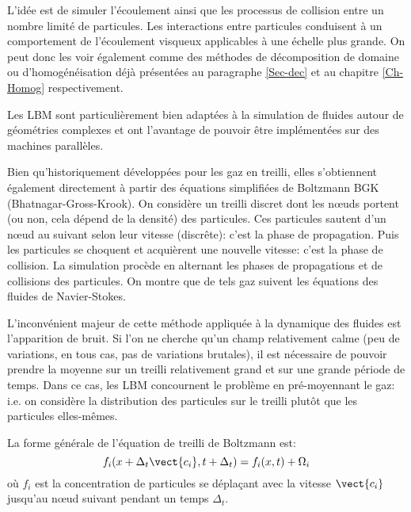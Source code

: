 L'idée est de simuler l'écoulement ainsi que les processus de collision entre un nombre limité de 
particules. Les interactions entre particules conduisent à un comportement de l'écoulement 
visqueux applicables à une échelle plus grande. 
On peut donc les voir également comme des méthodes de décomposition de domaine ou
d'homogénéisation déjà présentées au paragraphe \ref{Sec-dec} et au chapitre \ref{Ch-Homog}
respectivement.


\medskip
Les LBM sont particulièrement bien adaptées à la simulation de fluides autour de géométries
complexes et ont l'avantage de pouvoir être implémentées sur des machines parallèles.

Bien qu'historiquement développées pour les gaz en treilli, elles s'obtiennent également directement
à partir des équations simplifiées de Boltzmann BGK (Bhatnagar-Gross-Krook).
On considère un treilli discret dont les nœuds portent (ou non, cela dépend de la
densité) des particules.
Ces particules sautent d'un nœud au suivant selon leur vitesse (discrête): c'est la
phase de propagation.
Puis les particules se choquent et acquièrent une nouvelle vitesse: c'est la phase de collision.
La simulation procède en alternant les phases de propagations et de collisions des particules. 
On montre que de tels gaz suivent les équations des fluides de Navier-Stokes.

L'inconvénient majeur de cette méthode appliquée à la dynamique des fluides est l'apparition 
de \og bruit\fg.
Si l'on ne cherche qu'un champ relativement calme (peu de variations, en tous cas, pas de variations brutales),
il est nécessaire de pouvoir prendre la moyenne sur un treilli relativement grand et sur une grande
période de temps.
Dans ce cas, les LBM concournent le problème en pré-moyennant le gaz: i.e. on considère
la distribution des particules sur le treilli plutôt que les particules elles-mêmes.

\medskip
La forme générale de l'équation de treilli de Boltzmann est:
\begin{equation} f_i(x+\Delta_t \vect{c_i}, t+\Delta_t) = f_i(x,t) + \Omega_i \end{equation}
où $f_i$ est la concentration de particules se déplaçant avec la vitesse $\vect{c_i}$ jusqu'au nœud suivant
pendant un temps $\Delta_t$.

